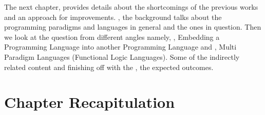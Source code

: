 \documentclass[thesis-solanki.tex]{subfiles}
\begin{document}
The next chapter,  provides details about the shortcomings of the
previous works and an approach for improvements.
, the background talks about the programming paradigms and languages
in general and the ones in question.
Then we look at the question from different angles namely, ,  Embedding
a Programming Language into another Programming Language and  , Multi
Paradigm Languages (Functional Logic Languages).
Some of the indirectly related content  and finishing off with the
, the expected outcomes.


\section{Chapter Recapitulation}
\end{document}
